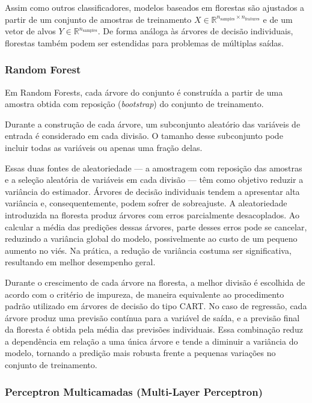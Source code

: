 Assim como outros classificadores, modelos baseados em florestas são ajustados a partir de um conjunto de amostras de treinamento \(X \in \mathbb{R}^{n_{\text{samples}} \times n_{\text{features}}}\) e de um vetor de alvos \(Y \in \mathbb{R}^{n_{\text{samples}}}\). De forma análoga às árvores de decisão individuais, florestas também podem ser estendidas para problemas de múltiplas saídas.

\subsubsection{Random Forest}

Em Random Forests, cada árvore do conjunto é construída a partir de uma amostra obtida com reposição (\textit{bootstrap}) do conjunto de treinamento.

Durante a construção de cada árvore, um subconjunto aleatório das variáveis de entrada é considerado em cada divisão. O tamanho desse subconjunto pode incluir todas as variáveis ou apenas uma fração delas. 

Essas duas fontes de aleatoriedade — a amostragem com reposição das amostras e a seleção aleatória de variáveis em cada divisão — têm como objetivo reduzir a variância do estimador. Árvores de decisão individuais tendem a apresentar alta variância e, consequentemente, podem sofrer de sobreajuste. A aleatoriedade introduzida na floresta produz árvores com erros parcialmente desacoplados. Ao calcular a média das predições dessas árvores, parte desses erros pode se cancelar, reduzindo a variância global do modelo, possivelmente ao custo de um pequeno aumento no viés. Na prática, a redução de variância costuma ser significativa, resultando em melhor desempenho geral.

Durante o crescimento de cada árvore na floresta, a melhor divisão é escolhida de acordo com o critério de impureza, de maneira equivalente ao procedimento padrão utilizado em árvores de decisão do tipo CART. No caso de regressão, cada árvore produz uma previsão contínua para a variável de saída, e a previsão final da floresta é obtida pela média das previsões individuais. Essa combinação reduz a dependência em relação a uma única árvore e tende a diminuir a variância do modelo, tornando a predição mais robusta frente a pequenas variações no conjunto de treinamento.





\subsubsection{Perceptron Multicamadas (Multi-Layer Perceptron)}

